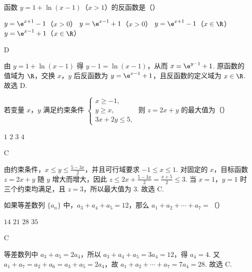 \begin{problem}
函数 \(y = 1 + \ln\left(x - 1\right)\)（\(x > 1\)）的反函数是（\quad）

\choices
    {\(y = \e^{x + 1} - 1\)（\(x > 0\)）}
    {\(y = \e^{x - 1} + 1\)（\(x > 0\)）}
    {\(y = \e^{x + 1} - 1\)（\(x \in \R\)）}
    {\(y = \e^{x - 1} + 1\)（\(x \in \R\)）}

\begin{answer}
D
\end{answer}

\begin{solution}
由 \(y=1+\ln\left(x-1\right)\) 得 \(y-1=\ln\left(x-1\right)\)，从而 \(x=\e^{y-1}+1\). 原函数的值域为 \(\R\)，交换 \(x\)，\(y\) 后反函数为 \(y=\e^{x-1}+1\)，且反函数的定义域为 \(x\in\R\). 故选 D.
\end{solution}
\end{problem}

\begin{problem}
若变量 \(x\)，\(y\) 满足约束条件 \(\begin{cases}
x \geqslant -1,\\
y \geqslant x,\\
3x + 2y \leqslant 5,
\end{cases}\) 则 \(z = 2x + y\) 的最大值为（\quad）

\choices
    {\(1\)}
    {\(2\)}
    {\(3\)}
    {\(4\)}

\begin{answer}
C
\end{answer}

\begin{solution}
由约束条件，\(x\leqslant y\leqslant\frac{5-3x}{2}\)，并且可行域要求 \(-1\leqslant x\leqslant1\). 对固定的 \(x\)，目标函数 \(z=2x+y\) 随 \(y\) 增大而增大，因此 \(z\leqslant2x+\frac{5-3x}{2}=\frac{x+5}{2}\leqslant3\). 当 \(x=1\)，\(y=1\) 时三个约束均满足，且 \(z=3\)，所以最大值为 \(3\). 故选 C.
\end{solution}
\end{problem}

\begin{problem}
如果等差数列 \(\{a_{n}\}\) 中，\(a_{3} + a_{4} + a_{5} = 12\)，那么 \(a_{1} + a_{2} + \cdots + a_{7} =\)（\quad）

\choices
    {\(14\)}
    {\(21\)}
    {\(28\)}
    {\(35\)}

\begin{answer}
C
\end{answer}

\begin{solution}
等差数列中 \(a_3+a_5=2a_4\)，所以 \(a_3+a_4+a_5=3a_4=12\)，得 \(a_4=4\). 又 \(a_1+a_7=a_2+a_6=a_3+a_5=2a_4\)，故 \(a_1+a_2+\cdots+a_7=7a_4=28\). 故选 C.
\end{solution}
\end{problem}

